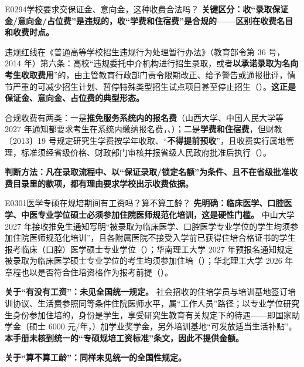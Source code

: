 \begin{qa}{E0294}{学校要求交保证金、意向金，这种收费合法吗？}
\textbf{关键区分：收“录取保证金/意向金/占位费”是违规的，收“学费和住宿费”是合规的——区别在收费名目和收费时点。}

违规红线在《普通高等学校招生违规行为处理暂行办法》（教育部令第 36 号，2014 年）第六条：高校“违规委托中介机构进行招生录取，或者\textbf{以承诺录取为名向考生收取费用}”的，由主管教育行政部门责令限期改正、给予警告或通报批评，情节严重的可减少招生计划、暂停特殊类型招生试点项目甚至停止招生（）。\textbf{这正是保证金、意向金、占位费的典型形态。}

合规收费有两类：一是\textbf{推免服务系统内的报名费}（山西大学、中国人民大学等 2027 年通知都要求考生在系统内缴纳报名费，、）；二是\textbf{学费和住宿费}，但财教〔2013〕19 号规定研究生学费按学年收取、“\textbf{不得提前预收}”，且收费实行属地管理，标准须经省级价格、财政部门审核并报省级人民政府批准后执行（）。

\textbf{判断方法：凡在录取流程中、以“保证录取/锁定名额”为条件、且不在省级批准收费目录里的款项，都有理由要求学校出示收费依据。}
\end{qa}

\begin{qa}{E0301}{医学专硕在规培期间有工资吗？算不算工龄？}
\textbf{先明确：临床医学、口腔医学、中医专业学位硕士必须参加住院医师规范化培训，这是硬性门槛。} 中山大学 2027 年接收推免生通知写明“被录取为临床医学、口腔医学专业学位的学生均须参加住院医师规范化培训”，且各附属医院不接受入学前已获得住培合格证书的学生报考临床（口腔）医学硕士专业学位（）；华南理工大学 2027 年预报名通知规定被录取为临床医学硕士专业学位的考生均须参加住培（）；华北理工大学 2026 年章程也以是否符合住培资格作为报考前提（）。

\textbf{关于“有没有工资”：未见全国统一规定。} 社会招收的住培学员与培训基地签订培训协议、生活费参照同等条件住院医师水平，属“工作人员”路径；以专业学位研究生身份参加住培的，身份是学生，享受研究生教育有关规定下的待遇——即国家助学金（硕士 6000 元/年，）加学业奖学金，另外培训基地“可发放适当生活补贴”。\textbf{本手册未核到统一的“专硕规培工资标准”条文，因此不提供金额。}

\textbf{关于“算不算工龄”：同样未见统一的全国性规定。}
\end{qa}

